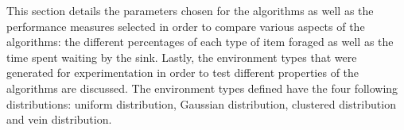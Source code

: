 This section details the parameters chosen for the algorithms as well as the performance measures selected in order to compare various aspects of the algorithms: the different percentages of each type of item foraged as well as the time spent waiting by the sink. Lastly, the environment types that were generated for experimentation in order to test different properties of the algorithms are discussed. The environment types defined have the four following distributions: uniform distribution, Gaussian distribution, clustered distribution and vein distribution. 


